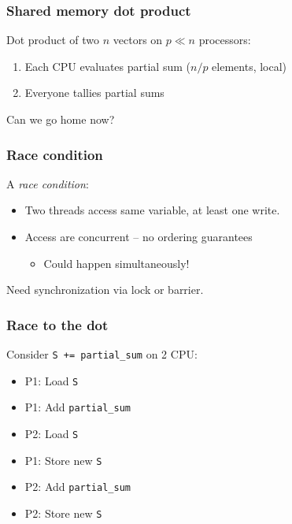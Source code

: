\documentclass{beamer}
\begin{document}
\begin{frame}
  \frametitle{Shared memory dot product}
  
  Dot product of two $n$ vectors on $p \ll n$ processors:
  \begin{enumerate}
  \item Each CPU evaluates partial sum ($n/p$ elements, local)
  \item Everyone tallies partial sums
  \end{enumerate}
  Can we go home now?
\end{frame}


\begin{frame}
  \frametitle{Race condition}

  A {\em race condition}:
  \begin{itemize}
  \item Two threads access same variable, at least one write.
  \item Access are concurrent -- no ordering guarantees
    \begin{itemize}
    \item Could happen simultaneously!
    \end{itemize}
  \end{itemize}
  Need synchronization via lock or barrier.
\end{frame}


\begin{frame}[fragile]
  \frametitle{Race to the dot}

  Consider {\tt S += partial\_sum} on 2 CPU:
  \begin{itemize}
  \item P1: Load {\tt S}
  \item P1: Add {\tt partial\_sum}
  \item P2: Load {\tt S}
  \item P1: Store new {\tt S}
  \item P2: Add {\tt partial\_sum}
  \item P2: Store new {\tt S}
  \end{itemize}
\end{frame}
\end{document}
